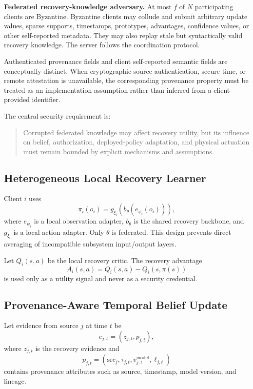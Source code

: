 \textbf{Federated recovery-knowledge adversary.}
At most $f$ of $N$ participating clients are Byzantine. Byzantine clients may collude and submit arbitrary update values, sparse supports, timestamps, prototypes, advantages, confidence values, or other self-reported metadata. They may also replay stale but syntactically valid recovery knowledge. The server follows the coordination protocol.

Authenticated provenance fields and client self-reported semantic fields are conceptually distinct. When cryptographic source authentication, secure time, or remote attestation is unavailable, the corresponding provenance property must be treated as an implementation assumption rather than inferred from a client-provided identifier.

The central security requirement is:
\begin{quote}
Corrupted federated knowledge may affect recovery utility, but its influence on belief, authorization, deployed-policy adaptation, and physical actuation must remain bounded by explicit mechanisms and assumptions.
\end{quote}

\subsection{Heterogeneous Local Recovery Learner}
Client $i$ uses
\begin{equation}
\pi_i(o_i)=g_{\xi_i}\!\left(b_{\theta}(e_{\psi_i}(o_i))\right),
\end{equation}
where $e_{\psi_i}$ is a local observation adapter, $b_{\theta}$ is the shared recovery backbone, and $g_{\xi_i}$ is a local action adapter. Only $\theta$ is federated. This design prevents direct averaging of incompatible subsystem input/output layers.

Let $Q_i(s,a)$ be the local recovery critic. The recovery advantage
\begin{equation}
A_i(s,a)=Q_i(s,a)-Q_i(s,\pi(s))
\end{equation}
is used only as a utility signal and never as a security credential.

\subsection{Provenance-Aware Temporal Belief Update}
Let evidence from source $j$ at time $t$ be
\begin{equation}
e_{j,t}=(z_{j,t},p_{j,t}),
\end{equation}
where $z_{j,t}$ is the recovery evidence and
\begin{equation}
p_{j,t}=(\mathrm{src}_j,\tau_{j,t},v_{j,t}^{\mathrm{model}},\ell_{j,t})
\end{equation}
contains provenance attributes such as source, timestamp, model version, and lineage.

